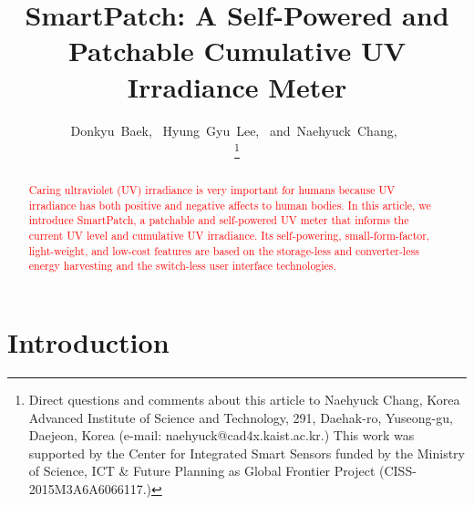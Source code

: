 \documentclass[journal]{IEEEtran}
\begin{document}
\title{SmartPatch: A Self-Powered and Patchable Cumulative UV Irradiance Meter}

\author{
	Donkyu~Baek,~
	Hyung~Gyu~Lee,~
	and~Naehyuck~Chang,~

\thanks{Direct questions and comments about this article to Naehyuck Chang, Korea Advanced Institute of Science and Technology, 291, Daehak-ro, Yuseong-gu, Daejeon, Korea (e-mail: naehyuck@cad4x.kaist.ac.kr.) This work was supported by the Center for Integrated Smart Sensors funded by the Ministry of Science, ICT \& Future Planning as Global Frontier Project (CISS-2015M3A6A6066117.)}
}

\maketitle

\begin{abstract}
\textcolor{red}{Caring ultraviolet (UV) irradiance is very important for humans because UV irradiance has both positive and negative affects to human bodies. In this article, we introduce SmartPatch, a patchable and self-powered UV meter that informs the current UV level and cumulative UV irradiance.  Its self-powering, small-form-factor, light-weight, and low-cost features are based on the storage-less and converter-less energy harvesting and the switch-less user interface technologies.} 
\end{abstract}



\section{Introduction}
\end{document}
